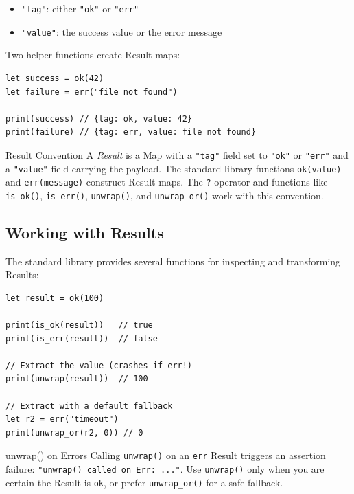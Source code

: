 \begin{itemize}
  \item \lstinline|"tag"|: either \lstinline|"ok"| or \lstinline|"err"|
  \item \lstinline|"value"|: the success value or the error message
\end{itemize}

Two helper functions create Result maps:

\begin{lstlisting}[language=Lattice, caption={Creating Result values}]
let success = ok(42)
let failure = err("file not found")

print(success) // {tag: ok, value: 42}
print(failure) // {tag: err, value: file not found}
\end{lstlisting}

\begin{defnbox}{Result Convention}
A \emph{Result} is a Map with a \lstinline|"tag"| field set to \lstinline|"ok"| or \lstinline|"err"| and a \lstinline|"value"| field carrying the payload. The standard library functions \lstinline|ok(value)| and \lstinline|err(message)| construct Result maps. The \lstinline|?| operator and functions like \lstinline|is_ok()|, \lstinline|is_err()|, \lstinline|unwrap()|, and \lstinline|unwrap_or()| work with this convention.
\end{defnbox}

\subsection{Working with Results}\label{sec:result-helpers}

The standard library provides several functions for inspecting and transforming Results:

\begin{lstlisting}[language=Lattice, caption={Result helper functions}]
let result = ok(100)

print(is_ok(result))   // true
print(is_err(result))  // false

// Extract the value (crashes if err!)
print(unwrap(result))  // 100

// Extract with a default fallback
let r2 = err("timeout")
print(unwrap_or(r2, 0)) // 0
\end{lstlisting}

\begin{warnbox}{unwrap() on Errors}
Calling \lstinline|unwrap()| on an \lstinline|err| Result triggers an assertion failure: \lstinline|"unwrap() called on Err: ..."|. Use \lstinline|unwrap()| only when you are certain the Result is \lstinline|ok|, or prefer \lstinline|unwrap_or()| for a safe fallback.
\end{warnbox}

